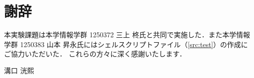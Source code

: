 \chapter*{謝辞}
\pagestyle{sj}
本実験課題は本学情報学群 1250372 三上 柊氏と共同で実施した．また本学情報学群 1250383 山本 昇永氏にはシェルスクリプトファイル（\ref{src:test}）の作成にご協力いただいた．
これらの方々に深く感謝いたします．
\begin{flushright}
    溝口 洸熙
\end{flushright}